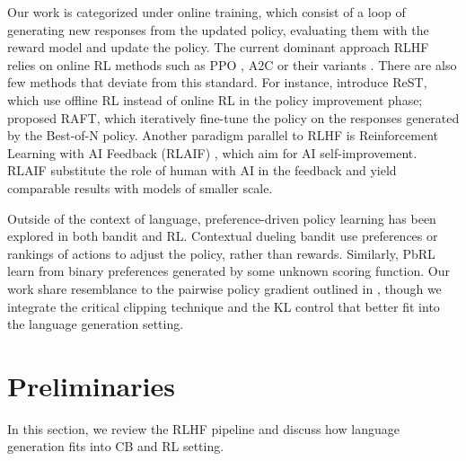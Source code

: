 \documentclass{article} %
\begin{document}
Our work is categorized under online training, which consist of a loop of generating new responses from the updated policy, evaluating them with the reward model and update the policy. The current dominant approach RLHF relies on online RL methods such as PPO \citep{schulman2017proximal}, A2C \citep{mnih2016asynchronous} or their variants \citep{ramamurthy2022reinforcement,zhu2023fine}. There are also few methods that deviate from this standard. For instance, \citet{gulcehre2023reinforced} introduce ReST, which use offline RL instead of online RL in the policy improvement phase; \citet{dong2023raft} proposed RAFT, which iteratively fine-tune the policy on the responses generated by the Best-of-N policy. Another paradigm parallel to RLHF is Reinforcement Learning with AI Feedback (RLAIF) \citep{bai2022constitutional,lee2023rlaif}, which aim for AI self-improvement. RLAIF substitute the role of human with AI in the feedback and yield comparable results with models of smaller scale.

Outside of the context of language, preference-driven policy learning has been explored in both bandit and RL. Contextual dueling bandit \citep{dudik2015contextual, yue2012k} use preferences or rankings of actions to adjust the policy, rather than rewards. Similarly, PbRL \citep{jain2013learning,busa2014preference,christiano2017deep,sadigh2017active,kupcsik2018learning} learn from binary preferences generated by some unknown scoring function. Our work share resemblance to the pairwise policy gradient outlined in \citet{xu2020reinforcement}, though we integrate the critical clipping technique and the KL control that better fit into the language generation setting.
\section{Preliminaries}
\label{sec:preliminaries}
In this section, we review the RLHF pipeline and discuss how language generation fits into CB and RL setting\citep{sutton2018reinforcement,yang2021reduction,lattimore2020bandit,wu2022nearly}.
\end{document}
